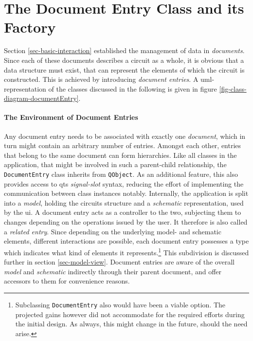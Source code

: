 \section{The Document Entry Class and its Factory}
	\label{sec-documentEntry}
	Section  \ref{sec-basic-interaction} established the management of data in \emph{documents}.
	Since each of these documents describes a circuit as a whole, it is obvious that a data structure must exist, that can represent the elements of which the circuit is constructed.
	This is achieved by introducing \emph{document entries}.
	A \gls{uml}-representation of the classes discussed in the following is given in figure \ref{fig-class-diagram-documentEntry}.	
	
	\paragraph{The Environment of Document Entries}
	Any document entry needs to be associated with exactly one \emph{document}, which in turn might contain an arbitrary number of entries.
	Amongst each other, entries that belong to the same document can form hierarchies.
	Like all classes in the application, that might be involved in such a parent-child relationship, the \texttt{DocumentEntry} class inherits from \texttt{QObject}.
	As an additional feature, this also provides access to \gls{qt}s \emph{signal-slot} syntax, reducing the effort of implementing the communication between class instances notably.
	Internally, the application is split into a \emph{model}, holding the circuits structure and a \emph{schematic} representation, used by the \gls{ui}.
	A document entry acts as a controller to the two, subjecting them to changes depending on the operations issued by the user.
	It therefore is also called a \emph{related entry}.
	Since depending on the underlying model- and schematic elements, different interactions are possible, each document entry possesses a type which indicates what kind of elements it represents.\footnote{
	Subclassing \texttt{DocumentEntry} also would have been a viable	option.
	The projected gains however did not accommodate for the required efforts during the initial design.
	As always, this might change in the future, should the need arise.
	}
	This subdivision is discussed further in section \ref{sec-model-view}.
	Document entries are aware of the overall \emph{model} and \emph{schematic} indirectly through their parent document, and offer accessors to them for convenience reasons. 

	

